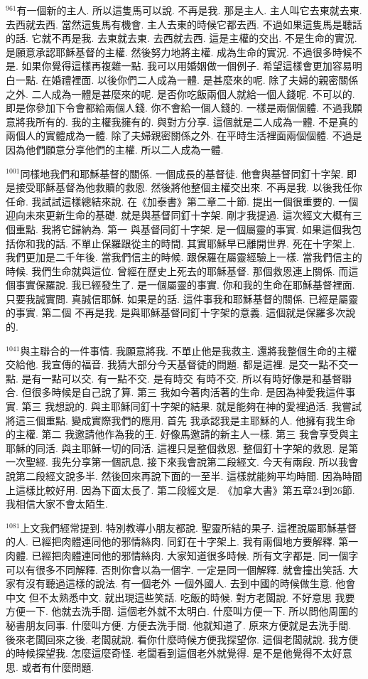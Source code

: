 \documentclass{book}
\begin{document}
$^{961}$有一個新的主人.
所以這隻馬可以說.
不再是我.
那是主人.
主人叫它去東就去東.
去西就去西.
當然這隻馬有機會.
主人去東的時候它都去西.
不過如果這隻馬是聽話的話.
它就不再是我.
去東就去東.
去西就去西.
這是主權的交出.
不是生命的實況.
是願意承認耶穌基督的主權.
然後努力地將主權.
成為生命的實況.
不過很多時候不是.
如果你覺得這樣再複雜一點.
我可以用婚姻做一個例子.
希望這樣會更加容易明白一點.
在婚禮裡面.
以後你們二人成為一體.
是甚麼來的呢.
除了夫婦的親密關係之外.
二人成為一體是甚麼來的呢.
是否你吃飯兩個人就給一個人錢呢.
不可以的.
即是你參加下令會都給兩個人錢.
你不會給一個人錢的.
一樣是兩個個體.
不過我願意將我所有的.
我的主權我擁有的.
與對方分享.
這個就是二人成為一體.
不是真的兩個人的實體成為一體.
除了夫婦親密關係之外.
在平時生活裡面兩個個體.
不過是因為他們願意分享他們的主權.
所以二人成為一體.

$^{1001}$同樣地我們和耶穌基督的關係.
一個成長的基督徒.
他會與基督同釘十字架.
即是接受耶穌基督為他救贖的救恩.
然後將他整個主權交出來.
不再是我.
以後我任你任命.
我試試這樣總結來說.
在《加泰書》第二章二十節.
提出一個很重要的.
一個迎向未來更新生命的基礎.
就是與基督同釘十字架.
剛才我提過.
這次經文大概有三個重點.
我將它歸納為.
第一 與基督同釘十字架.
是一個屬靈的事實.
如果這個我包括你和我的話.
不單止保羅跟從主的時間.
其實耶穌早已離開世界.
死在十字架上.
我們更加是二千年後.
當我們信主的時候.
跟保羅在屬靈經驗上一樣.
當我們信主的時候.
我們生命就與這位.
曾經在歷史上死去的耶穌基督.
那個救恩連上關係.
而這個事實保羅說.
我已經發生了.
是一個屬靈的事實.
你和我的生命在耶穌基督裡面.
只要我誠實問.
真誠信耶穌.
如果是的話.
這件事我和耶穌基督的關係.
已經是屬靈的事實.
第二個 不再是我.
是與耶穌基督同釘十字架的意義.
這個就是保羅多次說的.

$^{1041}$與主聯合的一件事情.
我願意將我.
不單止他是我救主.
還將我整個生命的主權交給他.
我宣傳的福音.
我猜大部分今天基督徒的問題.
都是這裡.
是交一點不交一點.
是有一點可以交.
有一點不交.
是有時交 有時不交.
所以有時好像是和基督聯合.
但很多時候是自己說了算.
第三 我如今著肉活著的生命.
是因為神愛我這件事實.
第三 我想說的.
與主耶穌同釘十字架的結果.
就是能夠在神的愛裡過活.
我嘗試將這三個重點.
變成實際我們的應用.
首先 我承認我是主耶穌的人.
他擁有我生命的主權.
第二 我邀請他作為我的王.
好像馬邀請的新主人一樣.
第三 我會享受與主耶穌的同活.
與主耶穌一切的同活.
這裡只是整個救恩.
整個釘十字架的救恩.
是第一次聖經.
我先分享第一個訊息.
接下來我會說第二段經文.
今天有兩段.
所以我會說第二段經文說多半.
然後回來再說下面的一至半.
這樣就能夠平均時間.
因為時間上這樣比較好用.
因為下面太長了.
第二段經文是.
《加拿大書》第五章24到26節.
我相信大家不會太陌生.

$^{1081}$上文我們經常提到.
特別教導小朋友都說.
聖靈所結的果子.
這裡說屬耶穌基督的人.
已經把肉體連同他的邪情絲肉.
同釘在十字架上.
我有兩個地方要解釋.
第一 肉體.
已經把肉體連同他的邪情絲肉.
大家知道很多時候.
所有文字都是.
同一個字可以有很多不同解釋.
否則你會以為一個字.
一定是同一個解釋.
就會撞出笑話.
大家有沒有聽過這樣的說法.
有一個老外 一個外國人.
去到中國的時候做生意.
他會中文 但不太熟悉中文.
就出現這些笑話.
吃飯的時候.
對方老闆說.
不好意思 我要方便一下.
他就去洗手間.
這個老外就不太明白.
什麼叫方便一下.
所以問他周圍的秘書朋友同事.
什麼叫方便.
方便去洗手間.
他就知道了.
原來方便就是去洗手間.
後來老闆回來之後.
老闆就說.
看你什麼時候方便我探望你.
這個老闆就說.
我方便的時候探望我.
怎麼這麼奇怪.
老闆看到這個老外就覺得.
是不是他覺得不太好意思.
或者有什麼問題.
\end{document}
